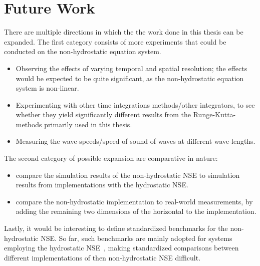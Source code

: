 \section{Future Work}
There are multiple directions in which the the work done in this thesis can be expanded.
The first category consists of more experiments that could be conducted on the non-hydrostatic equation system.
\begin{itemize}
\item Observing the effects of varying temporal and spatial resolution; the effects would be expected to be quite significant, as the non-hydrostatic equation system is non-linear.
\item Experimenting with other time integrations methods/other integrators, to see whether they yield significantly different results from the Runge-Kutta-methods primarily used in this thesis.
\item Measuring the wave-speeds/speed of sound of waves at different wave-lengths. 
\end{itemize}
The second category of possible expansion are comparative in nature:
\begin{itemize}
\item compare the simulation results of the non-hydrostatic NSE to simulation results from implementations with the hydrostatic NSE.
\item compare the non-hydrostatic implementation to real-world measurements, by adding the remaining two dimensions of the horizontal to the implementation.
\end{itemize}
Lastly, it would be interesting to define standardized benchmarks for the non-hydrostatic NSE.
So far, such benchmarks are mainly adopted for systems employing the hydrostatic NSE~\cite{williamson1992standard}, making standardized comparisons between different implementations of then non-hydrostatic NSE difficult.
